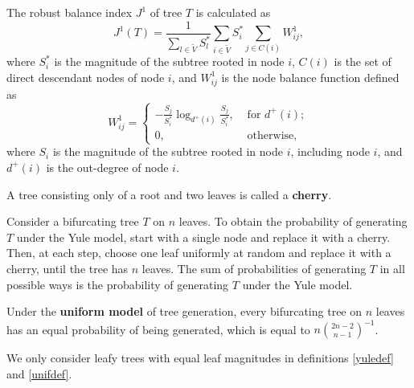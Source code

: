 \begin{definition}
            The robust balance index $J^1$ of tree $T$ is calculated as
            \begin{equation}\label{J1def}
                J^1(T) = \frac{1}{\sum_{l\in\tilde{V}}S_l^*} \sum_{i\in\tilde{V}} S_i^{*}\sum_{j\in C(i)}W_{ij}^{1},
            \end{equation}
            where $S_i^*$ is the magnitude of the subtree rooted in node $i$, $C(i)$ is the set of direct descendant nodes of node $i$, and $W_{ij}^1$ is the node balance function defined as 
            \begin{equation}\label{Wij1}
                W_{ij}^1 = 
                \begin{cases}
                    -\frac{S_j}{S_i^*}\log_{d^+(i)}\frac{S_j}{S_i^*},& \text{ for } d^+(i);\\
                    0, & \text{ otherwise,}
                \end{cases}
            \end{equation}
            where $S_i$ is the magnitude of the subtree rooted in node $i$, including node $i$, and $d^+(i)$ is the out-degree of node $i$.
\end{definition}
\begin{definition}[Cherry]
	A tree consisting only of a root and two leaves is called a \textbf{cherry}.
\end{definition}
\begin{definition}\label{yuledef}
    Consider a bifurcating tree $T$ on $n$ leaves. To obtain the probability of generating $T$ under the Yule model, start with a single node and replace it with a cherry. Then, at each step, choose one leaf uniformly at random and replace it with a cherry, until the tree has $n$ leaves. The sum of probabilities of generating $T$ in all possible ways is the probability of generating $T$ under the Yule model.
\end{definition}
\begin{definition}\label{unifdef}
    Under the \textbf{uniform model} of tree generation, every bifurcating tree on $n$ leaves has an equal probability of being generated, which is equal to $n\binom{2n-2}{n-1}^{-1}$.
\end{definition}
\begin{remark}
	We only consider leafy trees with equal leaf magnitudes in definitions \ref{yuledef} and \ref{unifdef}.
\end{remark}

